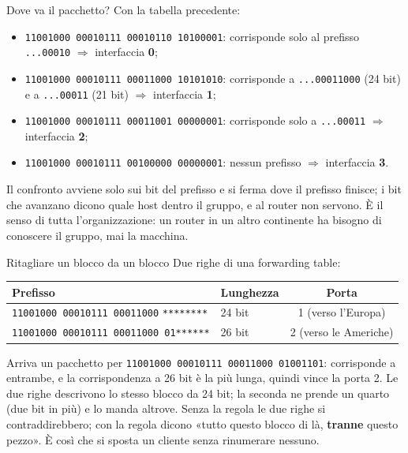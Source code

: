 \begin{esempio}{Dove va il pacchetto?}
Con la tabella precedente:
\begin{itemize}
    \item \texttt{11001000 00010111 00010110 10100001}: corrisponde solo al prefisso \texttt{...00010} $\Rightarrow$ interfaccia \textbf{0};
    \item \texttt{11001000 00010111 00011000 10101010}: corrisponde a \texttt{...00011000} (24 bit) e a \texttt{...00011} (21 bit)
          $\Rightarrow$ interfaccia \textbf{1};
    \item \texttt{11001000 00010111 00011001 00000001}: corrisponde solo a \texttt{...00011} $\Rightarrow$ interfaccia \textbf{2};
    \item \texttt{11001000 00010111 00100000 00000001}: nessun prefisso $\Rightarrow$ interfaccia \textbf{3}.
\end{itemize}
\end{esempio}

Il confronto avviene solo sui bit del prefisso e si ferma dove il prefisso finisce; i bit che avanzano dicono quale host
dentro il gruppo, e al router non servono. È il senso di tutta l'organizzazione: un router in un altro continente ha bisogno
di conoscere il gruppo, mai la macchina.

\begin{esempio}{Ritagliare un blocco da un blocco}
Due righe di una forwarding table:
\begin{center}
\begin{tabular}{l l c}
\toprule
\textbf{Prefisso} & \textbf{Lunghezza} & \textbf{Porta} \\
\midrule
\texttt{11001000 00010111 00011000} \texttt{********} & 24 bit & 1 (verso l'Europa) \\
\texttt{11001000 00010111 00011000 01}\texttt{******} & 26 bit & 2 (verso le Americhe) \\
\bottomrule
\end{tabular}
\end{center}
Arriva un pacchetto per \texttt{11001000 00010111 00011000 01001101}: corrisponde a entrambe, e la corrispondenza a 26 bit
è la più lunga, quindi vince la porta 2. Le due righe descrivono lo stesso blocco da 24 bit; la seconda ne prende un
quarto (due bit in più) e lo manda altrove. Senza la regola le due righe si contraddirebbero; con la regola dicono
«tutto questo blocco di là, \textbf{tranne} questo pezzo». È così che si sposta un cliente senza rinumerare nessuno.
\end{esempio}

